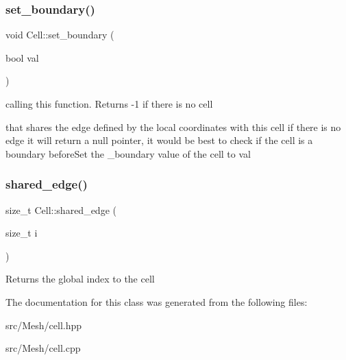\subsubsection{\texorpdfstring{set\+\_\+boundary()}{set\_boundary()}}
{\footnotesize\ttfamily void Cell\+::set\+\_\+boundary (\begin{DoxyParamCaption}\item[{bool}]{val }\end{DoxyParamCaption})}



calling this function. Returns -\/1 if there is no cell 

that shares the edge defined by the local coordinates with this cell if there is no edge it will return a null pointer, it would be best to check if the cell is a boundary before\+Set the \+\_\+boundary value of the cell to val \mbox{\label{classHArDCore2D_1_1Cell_a80ddbe4dea925baeec6da304a0873a2c}} 
\subsubsection{\texorpdfstring{shared\+\_\+edge()}{shared\_edge()}}
{\footnotesize\ttfamily size\+\_\+t Cell\+::shared\+\_\+edge (\begin{DoxyParamCaption}\item[{size\+\_\+t}]{i }\end{DoxyParamCaption})}

Returns the global index to the cell 

The documentation for this class was generated from the following files\+:\begin{DoxyCompactItemize}
\item 
src/\+Mesh/cell.\+hpp\item 
src/\+Mesh/cell.\+cpp\end{DoxyCompactItemize}
